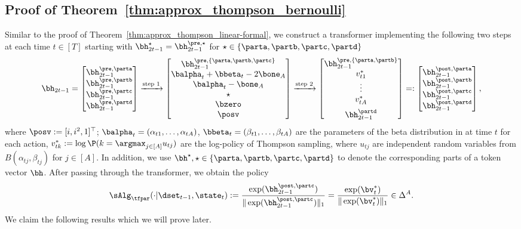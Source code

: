 \subsection{Proof of Theorem~\ref{thm:approx_thompson_bernoulli}}\label{sec:pf_thm:approx_thompson_bernoulli}
Similar to the proof of Theorem~\ref{thm:approx_thompson_linear-formal},
we construct a transformer implementing the following two steps at each time $t\in[T]$ starting with $\bh^{\star}_{2t-1}=\bh^{\pre,\star}_{2t-1}$ for $\star\in\{\parta,\partb,\partc,\partd\}$
\begin{align}
    \bh_{2t-1}=
    \begin{bmatrix}
    \bh_{2t-1}^{\pre,\parta} \\  \bh_{2t-1}^{\pre,\partb}\\  \bh_{2t-1}^{\pre,\partc}\\   \bh_{2t-1}^{\pre,\partd}
\end{bmatrix}
\xrightarrow{\text{step 1}}
   \begin{bmatrix}
    \bh_{2t-1}^{\pre,\{\parta,\partb,\partc\}} \\
        \balpha_t+\bbeta_t-2\bone_A\\\balpha_t-\bone_A\\ \star\\ \bzero \\\posv
\end{bmatrix}
\xrightarrow{\text{step 2}}
\begin{bmatrix}
    \bh_{2t-1}^{\pre,\{\parta,\partb\}}\\  v^*_{t1}\\\vdots\\ {v}^*_{tA} \vspace{0.5em}\\ \bh_{2t-1}^{\partd}
\end{bmatrix}
=:
\begin{bmatrix}
    \bh_{2t-1}^{\post,\parta} \\  \bh_{2t-1}^{\post,\partb}\\  \bh_{2t-1}^{\post,\partc}\\   \bh_{2t-1}^{\post,\partd}
\end{bmatrix},\label{eq:roadmap_ts_bernoulli}
\end{align}
where $\posv:=[i,i^2,1]^\top$; $\balpha_t=(\alpha_{t1},\ldots,\alpha_{tA})$, $\bbeta_t=(\beta_{t1},\ldots,\beta_{tA})$ are the parameters of the beta distribution in at time $t$ for each action, $v^*_{tk}:=\log \P(k=\argmax_{j\in[A]}u_{tj})$ are the log-policy of Thompson sampling, where $u_{tj}$ are independent random variables from $B(\alpha_{tj},\beta_{tj})$ for $j\in[A]$. In addition, we use $\bh^\star,\star\in\{\parta,\partb,\partc,\partd\}$ to denote the corresponding parts of a token vector $\bh$. After passing through the transformer, we obtain the policy
$$
\sAlg_\tfpar(\cdot|\dset_{t-1},\state_t):=\frac{\exp(\bh^{\post,\partc}_{2t-1})}{\|\exp(\bh^{\post,\partc}_{2t-1})\|_1}=\frac{\exp( \bv^*_t)}{\|\exp( \bv^*_t)\|_1}\in\Delta^A.
$$
We claim the following results which we will prove later.

